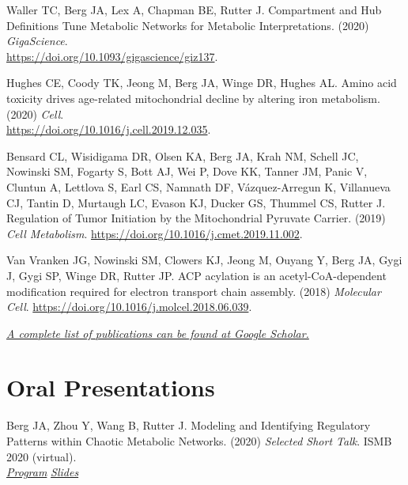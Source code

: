 \documentclass[margin,line]{res}
\begin{document}
\begin{resume}
Waller TC, Berg JA, Lex A, Chapman BE, Rutter J. Compartment and Hub Definitions Tune Metabolic Networks for Metabolic Interpretations. (2020) \textit{GigaScience}. \\ \href{https://academic.oup.com/gigascience/article/9/1/giz137/5714891}{https://doi.org/10.1093/gigascience/giz137}.

Hughes CE, Coody TK, Jeong M, Berg JA, Winge DR, Hughes AL. Amino acid toxicity drives age-related mitochondrial decline by altering iron metabolism. (2020) \textit{Cell}. \\
\href{https://www.sciencedirect.com/science/article/pii/S0092867419313972?via\%3Dihub}{https://doi.org/10.1016/j.cell.2019.12.035}.

Bensard CL, Wisidigama DR, Olsen KA, Berg JA, Krah NM, Schell JC, Nowinski SM, Fogarty S, Bott AJ, Wei P, Dove KK, Tanner JM, Panic V, Cluntun A, Lettlova S, Earl CS, Namnath DF, Vázquez-Arregun K, Villanueva CJ, Tantin D, Murtaugh LC, Evason KJ, Ducker GS, Thummel CS, Rutter J. Regulation of Tumor Initiation by the Mitochondrial Pyruvate Carrier. (2019) \textit{Cell Metabolism}. \href{https://www.sciencedirect.com/science/article/pii/S1550413119306096}{https://doi.org/10.1016/j.cmet.2019.11.002}.

Van Vranken JG, Nowinski SM, Clowers KJ, Jeong M, Ouyang Y, Berg JA, Gygi J, Gygi SP, Winge DR, Rutter JP. ACP acylation is an acetyl-CoA-dependent modification required for electron transport chain assembly. (2018) \textit{Molecular Cell}. \href{https://www.sciencedirect.com/science/article/pii/S1097276518305148}{https://doi.org/10.1016/j.molcel.2018.06.039}.

 \href{https://scholar.google.com/citations?user=0XsLZ3sAAAAJ&hl=en}{\textit{\small{A complete list of publications can be found at Google Scholar.}}}


\section{\sc Oral Presentations}
%
%

Berg JA, Zhou Y, Wang B, Rutter J. Modeling and Identifying Regulatory Patterns within Chaotic Metabolic Networks. (2020) \textit{Selected Short Talk}. ISMB 2020 (virtual). \\
\hspace*{12pt} \textit{\href{https://www.iscb.org/cms_addon/conferences/ismb2020/tracks/netbiocosi}{Program}}
\hspace*{12pt} \textit{\href{https://github.com/j-berg/presentations/blob/master/ISMB-2020/2020-07-16_ISMB-2020_Metaboverse.pdf}{Slides}}


\end{resume}
\end{document}
